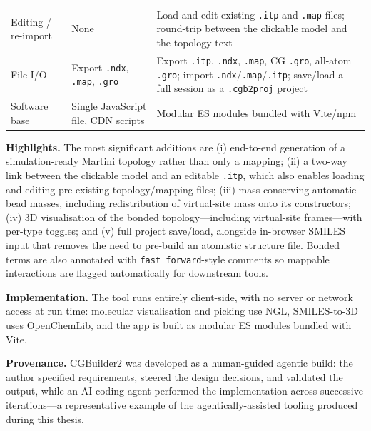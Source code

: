 \documentclass[11pt]{article}
\begin{document}
\begin{table}[h]
\begin{tabularx}{\textwidth}{@{}l Y Y@{}}
Editing / re-import & None & Load and edit existing \texttt{.itp} and \texttt{.map} files; round-trip between the clickable model and the topology text \\
File I/O            & Export \texttt{.ndx}, \texttt{.map}, \texttt{.gro} & Export \texttt{.itp}, \texttt{.ndx}, \texttt{.map}, CG \texttt{.gro}, all-atom \texttt{.gro}; import \texttt{.ndx}/\texttt{.map}/\texttt{.itp}; save/load a full session as a \texttt{.cgb2proj} project \\
Software base       & Single JavaScript file, CDN scripts & Modular ES modules bundled with Vite/npm \\
\bottomrule
\end{tabularx}
\end{table}

\vspace{-0.9em}

\textbf{Highlights.} The most significant additions are (i) end-to-end generation of
a simulation-ready Martini topology rather than only a mapping; (ii) a two-way link
between the clickable model and an editable \texttt{.itp}, which also enables loading
and editing pre-existing topology/mapping files; (iii) mass-conserving automatic bead
masses, including redistribution of virtual-site mass onto its constructors;
(iv) 3D visualisation of the bonded topology---including virtual-site frames---with
per-type toggles; and (v) full project save/load, alongside in-browser SMILES input
that removes the need to pre-build an atomistic structure file. Bonded terms are also
annotated with \texttt{fast\_forward}-style comments so mappable interactions are
flagged automatically for downstream tools.

\textbf{Implementation.} The tool runs entirely client-side, with no server or
network access at run time: molecular visualisation and picking use NGL, SMILES-to-3D
uses OpenChemLib, and the app is built as modular ES modules bundled with Vite.

\textbf{Provenance.} CGBuilder2 was developed as a human-guided agentic build: the
author specified requirements, steered the design decisions, and validated the
output, while an AI coding agent performed the implementation across successive
iterations---a representative example of the agentically-assisted tooling produced
during this thesis.
\end{document}

